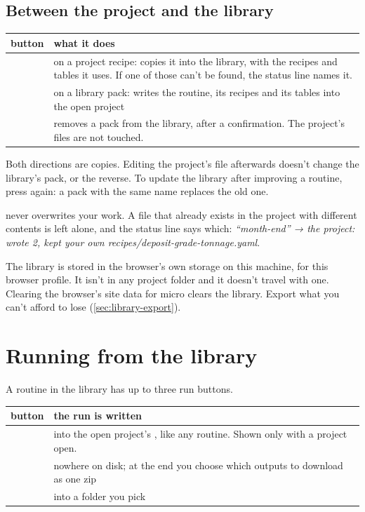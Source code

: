 \subsection{Between the project and the library}
\begin{tabularx}{\linewidth}{@{}lL@{}}\toprule
button & what it does \\ \midrule
{} & on a project recipe: copies it into the library, with the recipes and tables it uses. If one of those can't be found, the status line names it. \\
 & on a library pack: writes the routine, its recipes and its tables into the open project \\
 & removes a pack from the library, after a confirmation. The project's files are not touched. \\
\bottomrule
\end{tabularx}

Both directions are copies. Editing the project's file afterwards doesn't change the library's pack, or the reverse. To update the library after improving a routine, press  again: a pack with the same name replaces the old one.

 never overwrites your work. A file that already exists in the project with different contents is left alone, and the status line says which: \emph{“month-end” → the project: wrote 2, kept your own recipes/deposit-grade-tonnage.yaml}.

\begin{note}
The library is stored in the browser's own storage on this machine, for this browser profile. It isn't in any project folder and it doesn't travel with one. Clearing the browser's site data for micro clears the library. Export what you can't afford to lose (\cref{sec:library-export}).
\end{note}

\section{Running from the library}\label{sec:library-run}
A routine in the library has up to three run buttons.

\begin{tabularx}{\linewidth}{@{}lL@{}}\toprule
button & the run is written \\ \midrule
{} & into the open project's , like any routine. Shown only with a project open. \\
 & nowhere on disk; at the end you choose which outputs to download as one zip \\
 & into a folder you pick \\
\bottomrule
\end{tabularx}

